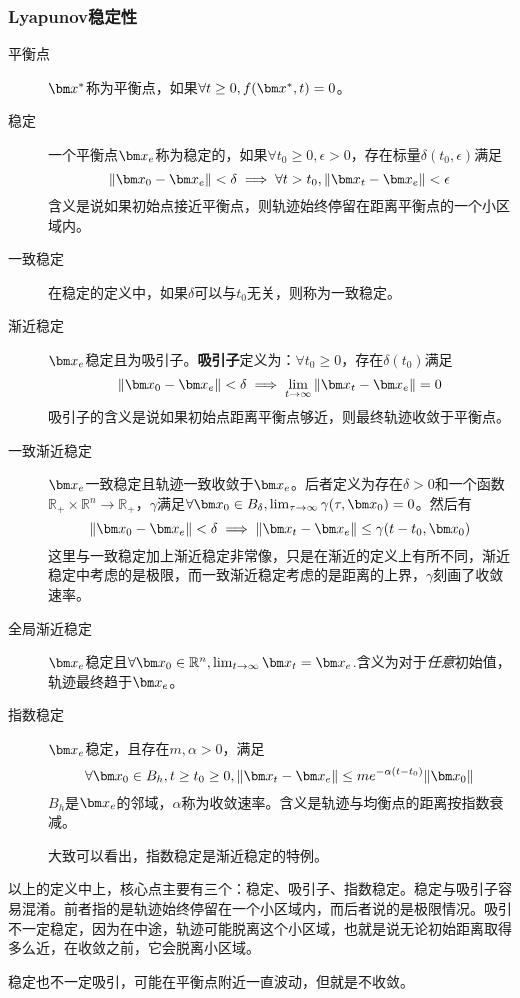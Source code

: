 \subsubsection{Lyapunov稳定性}
\begin{theorem}[Lyapunov稳定性]
\begin{description}
\item[平衡点] $\bx^*$称为平衡点，如果$\forall t\geq 0, f(\bx^*,t)=0$。
\item[稳定] 一个平衡点$\bx_e$称为稳定的，如果$\forall t_0\geq 0,\epsilon>0$，存在标量$\delta(t_0,\epsilon)$满足
$$\|\bx_0-\bx_e\|<\delta \implies \forall t>t_0,\|\bx_t-\bx_e\|<\epsilon$$
含义是说如果初始点接近平衡点，则轨迹始终停留在距离平衡点的一个小区域内。
\item[一致稳定] 在稳定的定义中，如果$\delta$可以与$t_0$无关，则称为一致稳定。
\item[渐近稳定] $\bx_e$稳定且为吸引子。\textbf{吸引子}定义为：$\forall t_0\geq 0$，存在$\delta(t_0)$满足
$$\|\bx_0-\bx_e\|<\delta \implies \lim_{t\rightarrow \infty}\|\bx_t-\bx_e\|=0$$
吸引子的含义是说如果初始点距离平衡点够近，则最终轨迹收敛于平衡点。
\item[一致渐近稳定] $\bx_e$一致稳定且轨迹一致收敛于$\bx_e$。后者定义为存在$\delta>0$和一个函数$\mathbb{R}_+\times \mathbb{R}^n\rightarrow \mathbb{R}_+$，$\gamma$满足$\forall \bx_0\in B_{\delta},\lim_{\tau\rightarrow \infty}\gamma(\tau,\bx_0)=0$。然后有
$$\|\bx_0-\bx_e\|<\delta \implies \|\bx_t-\bx_e\|\leq \gamma(t-t_0,\bx_0)$$
这里与一致稳定加上渐近稳定非常像，只是在渐近的定义上有所不同，渐近稳定中考虑的是极限，而一致渐近稳定考虑的是距离的上界，$\gamma$刻画了收敛速率。
\item[全局渐近稳定] $\bx_e$稳定且$\forall \bx_0\in\Rns,\lim_{t\rightarrow\infty} \bx_t=\bx_e$.含义为对于\emph{任意}初始值，轨迹最终趋于$\bx_e$。
\item[指数稳定] $\bx_e$稳定，且存在$m,\alpha>0$，满足
$$\forall \bx_0\in B_h,t\geq t_0\geq 0,\|\bx_t-\bx_e\|\leq me^{-\alpha(t-t_0)}\|\bx_0\|$$
$B_h$是$\bx_e$的邻域，$\alpha$称为收敛速率。含义是轨迹与均衡点的距离按指数衰减。

大致可以看出，指数稳定是渐近稳定的特例。
\end{description}
\end{theorem}
以上的定义中上，核心点主要有三个：稳定、吸引子、指数稳定。稳定与吸引子容易混淆。前者指的是轨迹始终停留在一个小区域内，而后者说的是极限情况。吸引不一定稳定，因为在中途，轨迹可能脱离这个小区域，也就是说无论初始距离取得多么近，在收敛之前，它会脱离小区域。

稳定也不一定吸引，可能在平衡点附近一直波动，但就是不收敛。
